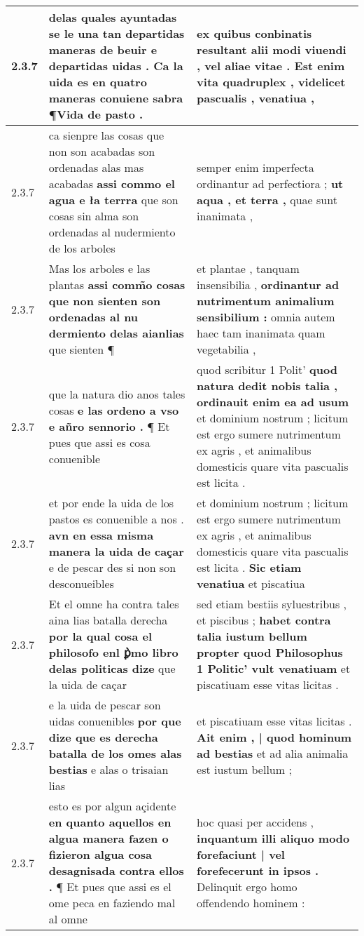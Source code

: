 \begin{tabular}{|p{1cm}|p{6.5cm}|p{6.5cm}|}
2.3.7 & delas quales ayuntadas se le una tan departidas maneras de beuir \textbf{ e departidas uidas . Ca la uida es en quatro maneras } conuiene sabra ¶Vida de pasto . & ex quibus conbinatis resultant alii modi viuendi , \textbf{ vel aliae vitae . Est enim vita quadruplex , } videlicet pascualis , venatiua , \\\hline
2.3.7 & ca sienpre las cosas que non son acabadas son ordenadas alas mas acabadas \textbf{ assi commo el agua e ła terrra } que son cosas sin alma son ordenadas al nudermiento de los arboles & semper enim imperfecta ordinantur ad perfectiora ; \textbf{ ut aqua , et terra , } quae sunt inanimata , \\\hline
2.3.7 & Mas los arboles e las plantas \textbf{ assi comm̃o cosas que non sienten son ordenadas al nu dermiento delas aianlias } que sienten ¶ & et plantae , tanquam insensibilia , \textbf{ ordinantur ad nutrimentum animalium sensibilium : } omnia autem haec tam inanimata quam vegetabilia , \\\hline
2.3.7 & que la natura dio anos tales cosas \textbf{ e las ordeno a vso e añro sennorio . } ¶ Et pues que assi es cosa conuenible & quod scribitur 1 Polit’ \textbf{ quod natura dedit nobis talia , ordinauit enim ea ad usum } et dominium nostrum ; licitum est ergo sumere nutrimentum ex agris , et animalibus domesticis quare vita pascualis est licita . \\\hline
2.3.7 & et por ende la uida de los pastos es conuenible a nos . \textbf{ avn en essa misma manera la uida de caçar } e de pescar des si non son desconueibles & et dominium nostrum ; licitum est ergo sumere nutrimentum ex agris , et animalibus domesticis quare vita pascualis est licita . \textbf{ Sic etiam venatiua } et piscatiua \\\hline
2.3.7 & Et el omne ha contra tales aina lias batalla derecha \textbf{ por la qual cosa el philosofo enl ꝑ̀mo libro delas politicas dize } que la uida de caçar & sed etiam bestiis syluestribus , et piscibus ; \textbf{ habet contra talia iustum bellum propter quod Philosophus 1 Politic’ vult venatiuam } et piscatiuam esse vitas licitas . \\\hline
2.3.7 & e la uida de pescar son uidas conuenibles \textbf{ por que dize que es derecha batalla de los omes alas bestias } e alas o trisaian lias & et piscatiuam esse vitas licitas . \textbf{ Ait enim , | quod hominum ad bestias } et ad alia animalia est iustum bellum ; \\\hline
2.3.7 & esto es por algun açidente \textbf{ en quanto aquellos en algua manera fazen o fizieron algua cosa desagnisada contra ellos . } ¶ Et pues que assi es el ome peca en faziendo mal al omne & hoc quasi per accidens , \textbf{ inquantum illi aliquo modo forefaciunt | vel forefecerunt in ipsos . } Delinquit ergo homo offendendo hominem : \\\hline

\end{tabular}
